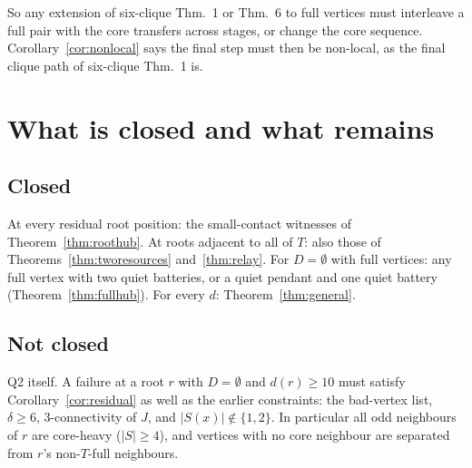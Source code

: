 \documentclass[11pt]{amsart}
\theoremstyle{definition}
\begin{document}
So any extension of six-clique Thm.~1 or Thm.~6 to full vertices must interleave a full pair with
the core transfers across stages, or change the core sequence. Corollary~\ref{cor:nonlocal} says
the final step must then be non-local, as the final clique path of six-clique Thm.~1 is.

\section{What is closed and what remains}\label{sec:remains}

\subsection*{Closed} At every residual root position: the small-contact witnesses of
Theorem~\ref{thm:roothub}. At roots adjacent to all of $T$: also those of
Theorems~\ref{thm:tworesources} and~\ref{thm:relay}. For $D=\emptyset$ with full
vertices: any full vertex with two quiet batteries, or a quiet pendant and one quiet battery
(Theorem~\ref{thm:fullhub}). For every $d$: Theorem~\ref{thm:general}.

\subsection*{Not closed} Q2 itself. A failure at a root $r$ with $D=\emptyset$ and $d(r)\ge10$
must satisfy Corollary~\ref{cor:residual} as well as the earlier constraints: the bad-vertex list,
$\delta\ge6$, $3$-connectivity of $J$, and $|S(x)|\notin\{1,2\}$. In particular all odd neighbours
of $r$ are core-heavy ($|S|\ge4$), and vertices with no core neighbour are separated from $r$'s
non-$T$-full neighbours.
\end{document}
